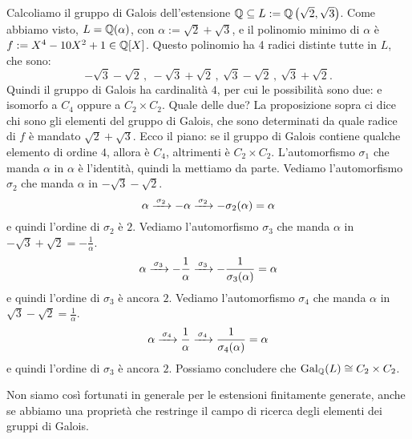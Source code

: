 \begin{esem}
Calcoliamo il gruppo di Galois dell'estensione \(\Q \subseteq L := \Q\left(\sqrt 2, \sqrt 3\right)\). Come abbiamo visto, \(L = \Q(\alpha)\), con \(\alpha := \sqrt2+\sqrt3\), e il polinomio minimo di \(\alpha\) è \(f := X^4-10X^2+1 \in \Q[X]\). Questo polinomio ha 4 radici distinte tutte in \(L\), che sono:
\[-\sqrt3-\sqrt2 \,,\ -\sqrt3+\sqrt2 \,,\ \sqrt3-\sqrt2 \,,\ \sqrt3+\sqrt2 .\]
Quindi il gruppo di Galois ha cardinalità \(4\), per cui le possibilità sono due: e isomorfo a \(C_4\) oppure a \(C_2 \times C_2\). Quale delle due? La proposizione sopra ci dice chi sono gli elementi del gruppo di Galois, che sono determinati da quale radice di \(f\) è mandato \(\sqrt2+\sqrt3\). Ecco il piano: se il gruppo di Galois contiene qualche elemento di ordine \(4\), allora è \(C_4\), altrimenti è \(C_2 \times C_2\).\newline
L'automorfismo \(\sigma_1\) che manda \(\alpha\) in \(\alpha\) è l'identità, quindi la mettiamo da parte. Vediamo l'automorfismo \(\sigma_2\) che manda \(\alpha\) in \(-\sqrt3-\sqrt2\).
\[\alpha \mor{\sigma_2} -\alpha \mor{\sigma_2} - \sigma_2 (\alpha) = \alpha\]
e quindi l'ordine di \(\sigma_2\) è \(2\). Vediamo l'automorfismo \(\sigma_3\) che manda \(\alpha\) in \(-\sqrt3+\sqrt2 = -\frac{1}{\alpha}\).
\[\alpha \mor{\sigma_3} -\frac{1}{\alpha} \mor{\sigma_3} - \frac{1}{\sigma_3 (\alpha)} = \alpha\]
e quindi l'ordine di \(\sigma_3\) è ancora \(2\). Vediamo l'automorfismo \(\sigma_4\) che manda \(\alpha\) in \(\sqrt3-\sqrt2 = \frac{1}{\alpha}\).
\[\alpha \mor{\sigma_4} \frac{1}{\alpha} \mor{\sigma_4} \frac{1}{\sigma_4 (\alpha)} = \alpha\]
e quindi l'ordine di \(\sigma_3\) è ancora \(2\). Possiamo concludere che \(\Gal[\Q]L \iso C_2 \times C_2\).
\end{esem}

Non siamo così fortunati in generale per le estensioni finitamente generate, anche se abbiamo una proprietà che restringe il campo di ricerca degli elementi dei gruppi di Galois.

